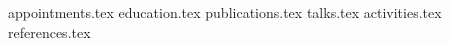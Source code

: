 \documentclass[letterpaper,10pt]{article}
\begin{document}

{appointments.tex}
{education.tex}
{publications.tex}
{talks.tex}
{activities.tex}
{references.tex}
\end{document}
